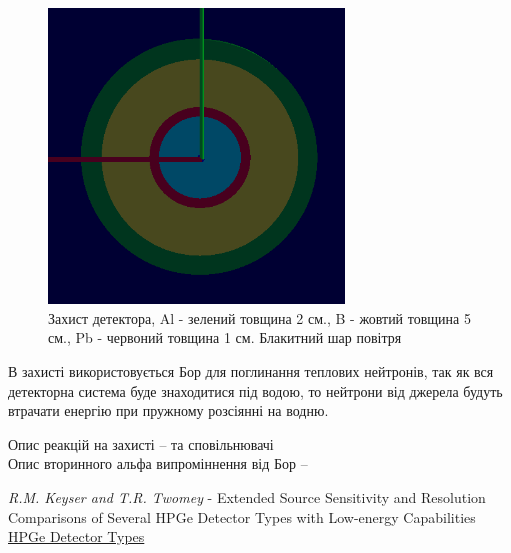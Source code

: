 \documentclass[a4paper, 14pt]{article}
\numberwithin{equation}{section}
\numberwithin{table}{section}
\begin{document}
	\begin{figure}[hbt!]
		\centering \includegraphics[width=0.7\textwidth]{images/dectorPrt.png}
		\caption{Захист детектора, Al - зелений товщина 2 см., B - жовтий товщина 5 см., Pb - червоний товщина 1 см. Блакитний шар повітря} 
		\label{ris:s_detector_P}	
	\end{figure} 

	В захисті використовується Бор для поглинання теплових нейтронів, так як вся детекторна система буде знаходитися під водою, то нейтрони від джерела будуть втрачати енергію при пружному розсіянні на водню. 
	
	Опис реакцій на захисті -- та сповільнювачі \\
	Опис вторинного альфа випроміннення від Бор --

\newpage
\begin{thebibliography}{}
	 \textit{R.M. Keyser and T.R. Twomey} - Extended Source Sensitivity and Resolution Comparisons of Several HPGe Detector Types with Low-energy Capabilities \\
	\href{https://www.ortec-online.com/-/media/ametekortec/technical%20papers/high%20purity%20germanium%20detector%20applications%20and%20technology%20developements/extended-source-sensitivity-resolution-comparisons-several-hpge-detector-types-low-energy-capabilities.pdf?la=en}{ HPGe Detector Types}
	
\end{thebibliography}
\end{document}
